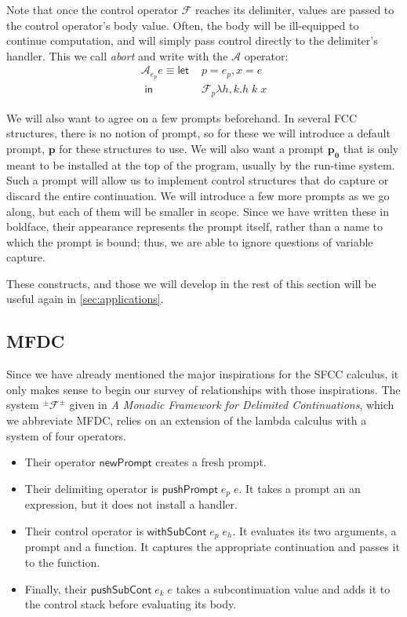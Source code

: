 \documentclass[11pt]{article}
\newcommand{\maybePage}{\newpage}
\newcommand{\letin}[2]{\textsf{let }#1\textsf{ in }#2}
\newcommand\F{\mathcal{F}}
\newcommand\A{\mathcal{A}}
\newcommand\pmFpm{^\pm\F^\pm}
\begin{document}
Note that once the control operator $\F$ reaches its delimiter, values are passed to the control operator's body value.
Often, the body will be ill-equipped to continue computation, and will simply pass control directly to the delimiter's handler.
This we call \emph{abort} and write with the $\A$ operator:
\begin{align*}
\A_{e_p}e \equiv \letin{&p = e_p, x = e\\}%
                       {&\F_{p}\lambda h,k. h\;k\;x}
\end{align*}

We will also want to agree on a few prompts beforehand.
In several FCC structures, there is no notion of prompt, so for these we will introduce a default prompt, $\mathbf{p}$ for these structures to use.
We will also want a prompt $\mathbf{p_0}$ that is only meant to be installed at the top of the program, usually by the run-time system.
Such a prompt will allow us to implement control structures that do capture or discard the entire continuation.
We will introduce a few more prompts as we go along, but each of them will be smaller in scope.
Since we have written these in boldface, their appearance represents the prompt itself, rather than a name to which the prompt is bound; thus, we are able to ignore questions of variable capture.

These constructs, and those we will develop in the rest of this section will be useful again in \ref{sec:applications}.

\maybePage
\subsection{MFDC}

Since we have already mentioned the major inspirations for the SFCC calculus, it only makes sense to begin our survey of relationships with those inspirations.
The system $\pmFpm$ given in \textit{A Monadic Framework for Delimited Continuations}\cite{MFDC}, which we abbreviate MFDC, relies on an extension of the lambda calculus with a system of four operators.

\begin{itemize}
\item Their operator $\mathsf{newPrompt}$ creates a fresh prompt.
\item Their delimiting operator is $\mathsf{pushPrompt}\;e_p\;e$.
It takes a prompt an an expression, but it does not install a handler.
\item Their control operator is $\mathsf{withSubCont}\;e_p\;e_h$.
It evaluates its two arguments, a prompt and a function.
It captures the appropriate continuation and passes it to the function.
\item Finally, their $\mathsf{pushSubCont}\;e_k\;e$ takes a subcontinuation value and adds it to the control stack before evaluating its body.
\end{itemize}
\end{document}
